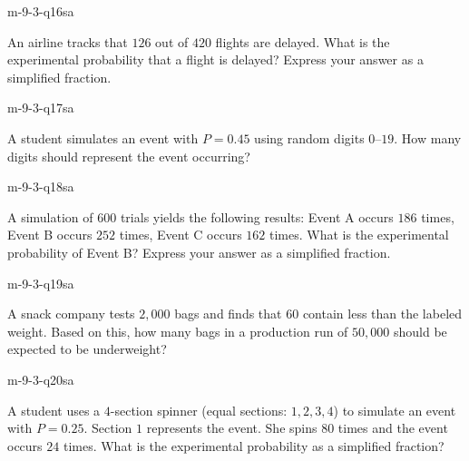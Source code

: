 
\begin{practiceQuestion}{m-9-3-q16}{sa}
\begin{questionText}
An airline tracks that $126$ out of $420$ flights are delayed. What is the experimental probability that a flight is delayed? Express your answer as a simplified fraction.
\end{questionText}
\end{practiceQuestion}

\begin{practiceQuestion}{m-9-3-q17}{sa}
\begin{questionText}
A student simulates an event with $P = 0.45$ using random digits $0$--$19$. How many digits should represent the event occurring?
\end{questionText}
\end{practiceQuestion}

\begin{practiceQuestion}{m-9-3-q18}{sa}
\begin{questionText}
A simulation of $600$ trials yields the following results: Event A occurs $186$ times, Event B occurs $252$ times, Event C occurs $162$ times. What is the experimental probability of Event B? Express your answer as a simplified fraction.
\end{questionText}
\end{practiceQuestion}

\begin{practiceQuestion}{m-9-3-q19}{sa}
\begin{questionText}
A snack company tests $2{,}000$ bags and finds that $60$ contain less than the labeled weight. Based on this, how many bags in a production run of $50{,}000$ should be expected to be underweight?
\end{questionText}
\end{practiceQuestion}

\begin{practiceQuestion}{m-9-3-q20}{sa}
\begin{questionText}
A student uses a $4$-section spinner (equal sections: $1, 2, 3, 4$) to simulate an event with $P = 0.25$. Section $1$ represents the event. She spins $80$ times and the event occurs $24$ times. What is the experimental probability as a simplified fraction?
\end{questionText}
\end{practiceQuestion}

